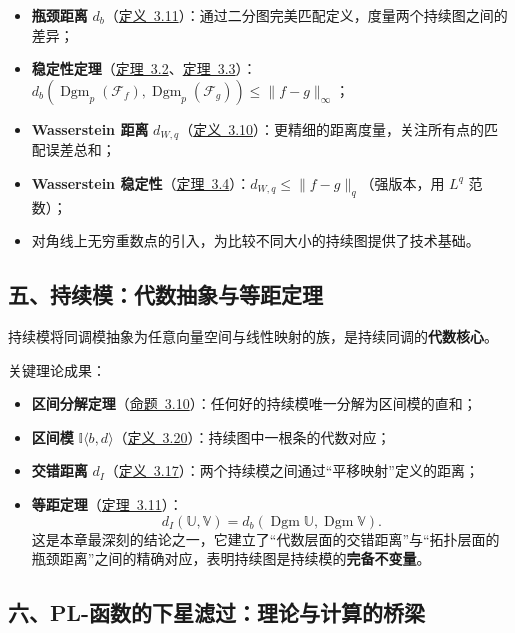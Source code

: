 \documentclass[UTF8]{ctexart}
\begin{document}
\begin{itemize}
    \item \textbf{瓶颈距离} \(d_b\)（\hyperref[def:bottleneck-distance]{定义~3.11}）：通过二分图完美匹配定义，度量两个持续图之间的差异；
    \item \textbf{稳定性定理}（\hyperref[thm:simplicial-stability]{定理~3.2}、\hyperref[thm:space-stability]{定理~3.3}）：\(\displaystyle d_b(\operatorname{Dgm}_p(\mathcal{F}_f), \operatorname{Dgm}_p(\mathcal{F}_g)) \le \|f - g\|_\infty\)；
    \item \textbf{Wasserstein 距离} \(d_{W,q}\)（\hyperref[def:wasserstein-distance]{定义~3.10}）：更精细的距离度量，关注所有点的匹配误差总和；
    \item \textbf{Wasserstein 稳定性}（\hyperref[thm:wasserstein-strong]{定理~3.4}）：\(\displaystyle d_{W,q} \le \|f - g\|_q\)（强版本，用 \(L^q\) 范数）；
    \item 对角线上无穷重数点的引入，为比较不同大小的持续图提供了技术基础。
\end{itemize}

\subsection*{五、持续模：代数抽象与等距定理}

持续模将同调模抽象为任意向量空间与线性映射的族，是持续同调的\textbf{代数核心}。

关键理论成果：
\begin{itemize}
    \item \textbf{区间分解定理}（\hyperref[prop:interval-decomposition]{命题~3.10}）：任何好的持续模唯一分解为区间模的直和；
    \item \textbf{区间模} \(\mathbb{I}\langle b,d\rangle\)（\hyperref[def:interval-module]{定义~3.20}）：持续图中一根条的代数对应；
    \item \textbf{交错距离} \(d_I\)（\hyperref[def:interleaving-distance]{定义~3.17}）：两个持续模之间通过“平移映射”定义的距离；
    \item \textbf{等距定理}（\hyperref[thm:isometry]{定理~3.11}）：
    \[
    d_I(\mathbb{U}, \mathbb{V}) = d_b(\operatorname{Dgm}\mathbb{U}, \operatorname{Dgm}\mathbb{V}).
    \]
    这是本章最深刻的结论之一，它建立了“代数层面的交错距离”与“拓扑层面的瓶颈距离”之间的精确对应，表明持续图是持续模的\textbf{完备不变量}。
\end{itemize}

\subsection*{六、PL-函数的下星滤过：理论与计算的桥梁}
\end{document}
